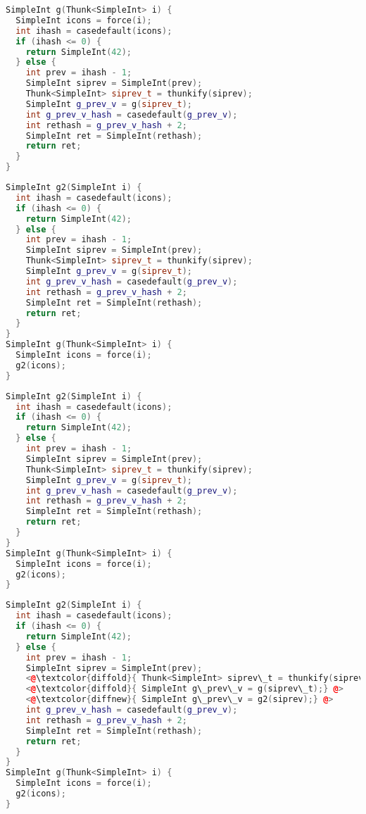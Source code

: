 \documentclass[sigplan,\review anonymous]{acmart}
\begin{document}
{\footnotesize
\begin{lstlisting}[language=c++, caption=Step 0: the initial program]
SimpleInt g(Thunk<SimpleInt> i) {
  SimpleInt icons = force(i);
  int ihash = casedefault(icons);
  if (ihash <= 0) {
    return SimpleInt(42);
  } else {
    int prev = ihash - 1;
    SimpleInt siprev = SimpleInt(prev);
    Thunk<SimpleInt> siprev_t = thunkify(siprev);
    SimpleInt g_prev_v = g(siprev_t);
    int g_prev_v_hash = casedefault(g_prev_v);
    int rethash = g_prev_v_hash + 2;
    SimpleInt ret = SimpleInt(rethash);
    return ret;
  }
}
\end{lstlisting}


\begin{lstlisting}[language=c++, caption=Step 1: outline everything after \texttt{force}]
SimpleInt g2(SimpleInt i) {
  int ihash = casedefault(icons);
  if (ihash <= 0) {
    return SimpleInt(42);
  } else {
    int prev = ihash - 1;
    SimpleInt siprev = SimpleInt(prev);
    Thunk<SimpleInt> siprev_t = thunkify(siprev);
    SimpleInt g_prev_v = g(siprev_t);
    int g_prev_v_hash = casedefault(g_prev_v);
    int rethash = g_prev_v_hash + 2;
    SimpleInt ret = SimpleInt(rethash);
    return ret;
  }
}
SimpleInt g(Thunk<SimpleInt> i) {
  SimpleInt icons = force(i);
  g2(icons);
}
\end{lstlisting}


\begin{lstlisting}[language=c++, caption=Step 2: outline everything after \texttt{force}]
SimpleInt g2(SimpleInt i) {
  int ihash = casedefault(icons);
  if (ihash <= 0) {
    return SimpleInt(42);
  } else {
    int prev = ihash - 1;
    SimpleInt siprev = SimpleInt(prev);
    Thunk<SimpleInt> siprev_t = thunkify(siprev);
    SimpleInt g_prev_v = g(siprev_t);
    int g_prev_v_hash = casedefault(g_prev_v);
    int rethash = g_prev_v_hash + 2;
    SimpleInt ret = SimpleInt(rethash);
    return ret;
  }
}
SimpleInt g(Thunk<SimpleInt> i) {
  SimpleInt icons = force(i);
  g2(icons);
}
\end{lstlisting}


\begin{lstlisting}[language=c++, caption=Step 2: replace recursive call to \texttt{g}]
SimpleInt g2(SimpleInt i) {
  int ihash = casedefault(icons);
  if (ihash <= 0) {
    return SimpleInt(42);
  } else {
    int prev = ihash - 1;
    SimpleInt siprev = SimpleInt(prev);
    <@\textcolor{diffold}{ Thunk<SimpleInt> siprev\_t = thunkify(siprev)} @>;
    <@\textcolor{diffold}{ SimpleInt g\_prev\_v = g(siprev\_t);} @>
    <@\textcolor{diffnew}{ SimpleInt g\_prev\_v = g2(siprev);} @>
    int g_prev_v_hash = casedefault(g_prev_v);
    int rethash = g_prev_v_hash + 2;
    SimpleInt ret = SimpleInt(rethash);
    return ret;
  }
}
SimpleInt g(Thunk<SimpleInt> i) {
  SimpleInt icons = force(i);
  g2(icons);
}
\end{lstlisting}


}
\end{document}
